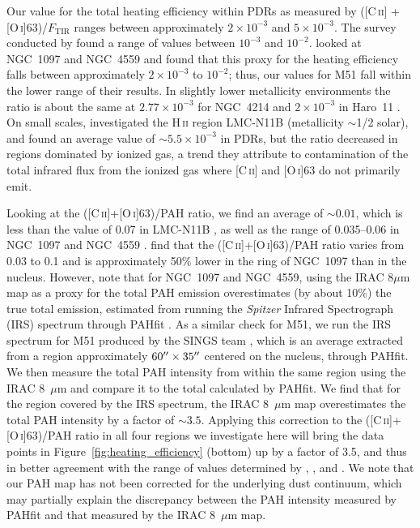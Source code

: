 Our value for the total heating efficiency within PDRs as measured by ([C\,\textsc{ii}] + [O\,\textsc{i}]63)/$F_{\mathrm{TIR}}$ ranges between approximately $2 \times 10^{-3}$ and $5 \times 10^{-3}$.  The survey conducted by \citet{2001ApJ...561..766M} found a range of values between $10^{-3}$ and $10^{-2}$.  \citet{2012ApJ...747...81C} looked at NGC~1097 and NGC~4559 and found that this proxy for the heating efficiency falls between approximately $2 \times 10^{-3}$ to $10^{-2}$; thus, our values for M51 fall within the lower range of their results.  In slightly lower metallicity environments the ratio is about the same at $2.77 \times 10^{-3}$ for NGC~4214 \citep[metallicity of log(O/H)$+ 12 = 8.2$;][]{2010A&A...518L..57C} and $2 \times 10^{-3}$ in Haro~11 \citep[metallicity 1/3 solar;][]{2012A&A...548A..20C}.  On small scales, \citet{2012A&A...548A..91L} investigated the H\,\textsc{ii} region LMC-N11B (metallicity $\sim$1/2 solar), and found an average value of $\sim 5.5 \times 10^{-3}$ in PDRs, but the ratio decreased in regions dominated by ionized gas, a trend they attribute to contamination of the total infrared flux from the ionized gas where [C\,\textsc{ii}] and [O\,\textsc{i}]63 do not primarily emit.

Looking at the ([C\,\textsc{ii}]+[O\,\textsc{i}]63)/PAH ratio, we find an average of $\sim0.01$, which is less than the value of 0.07 in LMC-N11B \citep{2012A&A...548A..91L}, as well as the range of 0.035--0.06 in NGC~1097 and NGC~4559 \citep{2012ApJ...747...81C}.  \citet{2012ApJ...751..144B} find that the ([C\,\textsc{ii}]+[O\,\textsc{i}]63)/PAH ratio varies from 0.03 to 0.1 and is approximately 50\% lower in the ring of NGC~1097 than in the nucleus.  However, \citet{2012ApJ...747...81C} note that for NGC~1097 and NGC~4559, using the IRAC 8$\mu$m map as a proxy for the total PAH emission overestimates (by about 10\%) the true total emission, estimated from running the \emph{Spitzer} Infrared Spectrograph (IRS) spectrum through PAHfit \citep{2007ApJ...656..770S}.  As a similar check for M51, we run the IRS spectrum for M51 produced by the SINGS team \citep{2003PASP..115..928K}, which is an average extracted from a region approximately $60\mbox{$^{\prime\prime}$} \times 35\mbox{$^{\prime\prime}$}$ centered on the nucleus, through PAHfit.  We then measure the total PAH intensity from within the same region using the IRAC 8~$\mu$m and compare it to the total calculated by PAHfit.  We find that for the region covered by the IRS spectrum, the IRAC 8~$\mu$m map overestimates the total PAH intensity by a factor of $\sim3.5$.  Applying this correction to the ([C\,\textsc{ii}]+[O\,\textsc{i}]63)/PAH ratio in all four regions we investigate here will bring the data points in Figure~\ref{fig:heating_efficiency} (bottom) up by a factor of 3.5, and thus in better agreement with the range of values determined by \citep{2012A&A...548A..91L}, \citet{2012ApJ...751..144B}, and \citep{2012ApJ...747...81C}.  We note that our PAH map has not been corrected for the underlying dust continuum, which may partially explain the discrepancy between the PAH intensity measured by PAHfit and that measured by the IRAC 8~$\mu$m map.

